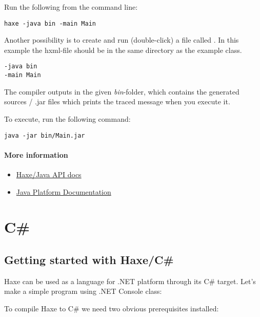 Run the following from the command line:

\begin{lstlisting}
haxe -java bin -main Main
\end{lstlisting}

Another possibility is to create and run (double-click) a file called . In this example the hxml-file should be in the same directory as the example class.

\begin{lstlisting}
-java bin
-main Main
\end{lstlisting}

The compiler outputs in the given \emph{bin}-folder, which contains the generated sources / .jar files which prints the traced message when you execute it. 

To execute, run the following command:

\begin{lstlisting}
java -jar bin/Main.jar
\end{lstlisting}

\paragraph{More information}

\begin{itemize}
	\item \href{https://api.haxe.org/java/}{Haxe/Java API docs}
	\item \href{https://docs.oracle.com/javase/}{Java Platform Documentation}
\end{itemize}


\section{C\#}
\label{target-cs}

\subsection{Getting started with Haxe/C\#}
\label{target-cs-getting-started}

Haxe can be used as a language for .NET platform through its C\# target. Let's make a simple program using .NET Console class:


To compile Haxe to C\# we need two obvious prerequisites installed:

